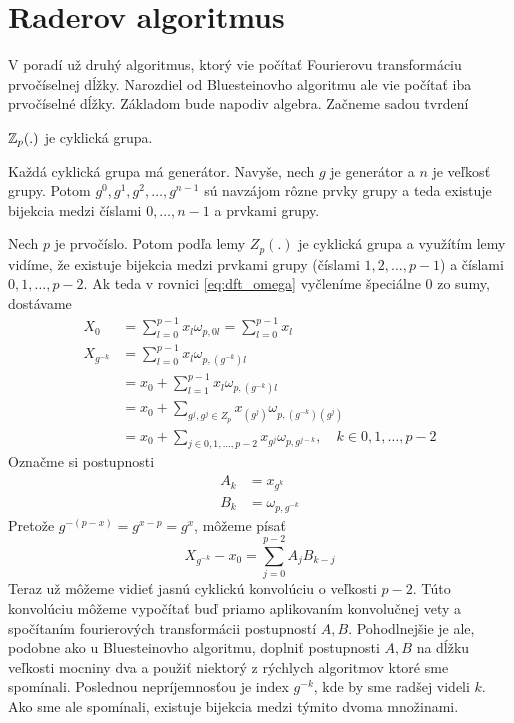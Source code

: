 \section{Raderov algoritmus}
V poradí už druhý algoritmus, ktorý vie počítať Fourierovu
transformáciu prvočíselnej dĺžky. Narozdiel od Bluesteinovho algoritmu
ale vie počítať iba prvočíselné dĺžky. Základom bude napodiv algebra.
Začneme sadou tvrdení

\begin{definicia}[grupa]
\end{definicia}
\begin{lema}
    $\mathbb{Z}_p(.)$ je cyklická grupa.
\end{lema}
\begin{definicia}[generator]
\end{definicia}
\begin{lema}
    Každá cyklická grupa má generátor. Navyše, nech $g$ je generátor a
    $n$ je veľkosť grupy. Potom
    $g^0,g^1,g^2,\dots,g^{n-1}$ sú navzájom rôzne prvky grupy a teda
    existuje bijekcia medzi číslami $0,\dots,n-1$ a prvkami grupy.
\end{lema}

Nech $p$ je prvočíslo. Potom podľa lemy  $Z_p(.)$ je
cyklická grupa a využítím lemy  vidíme, že existuje bijekcia
medzi prvkami grupy (číslami $1,2,\dots,p-1$) a číslami $0,1,\dots,p-2$.
Ak teda v rovnici \ref{eq:dft_omega} vyčleníme špeciálne 0 zo sumy,
dostávame
\begin{align}
    X_0 &= \sum_{l=0}^{p-1} x_l \omega_{p,0l} = \sum_{l=0}^{p-1} x_l \\
    X_{g^{-k}} &= \sum_{l=0}^{p-1} x_l \omega_{p,(g^{-k}) l} \\
            &= 
        x_0 + \sum_{l=1}^{p-1} x_l \omega_{p,(g^{-k}) l} \\
        &=
        x_0 + \sum_{g^j, g^j \in Z_p} x_{(g^j)} \omega_{p, (g^{-k})
        (g^j)} \\
        &= x_0 + \sum_{j \in 0,1,\dots,p-2} x_{g^j} \omega_{p,
        g^{j-k}}, \quad k \in 0,1,\dots,p-2
\end{align}
Označme si postupnosti
\begin{align}
    A_k &= x_{g^k} \\
    B_k &= \omega_{p, g^{-k}}
\end{align}
Pretože $g^{-(p-x)} = g^{x - p} = g^{x}$, môžeme písať
\begin{equation}
    X_{g^{-k}} -x_0=  \sum_{j=0}^{p-2} A_j B_{k-j}
\end{equation}
Teraz už môžeme vidieť jasnú cyklickú konvolúciu o veľkosti $p-2$.
Túto konvolúciu môžeme vypočítať buď priamo aplikovaním konvolučnej
vety  a spočítaním fourierových transformácii postupností
$A,B$. Pohodlnejšie je ale, podobne ako u Bluesteinovho algoritmu,
doplniť postupnosti $A,B$ na dĺžku veľkosti mocniny dva a použiť
niektorý z rýchlych algoritmov ktoré sme spomínali.
Poslednou nepríjemnosťou je index $g^{-k}$, kde by sme radšej videli
$k$. Ako sme ale spomínali, existuje bijekcia medzi týmito dvoma
množinami.



